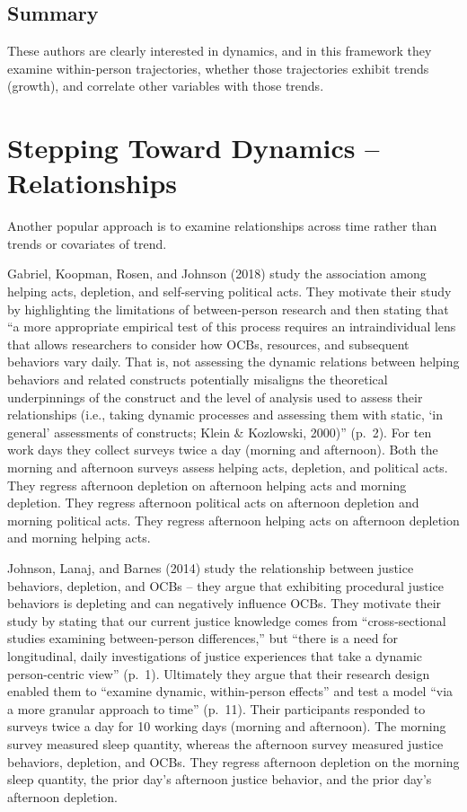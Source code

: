 \documentclass[english,,man]{apa6}
\theoremstyle{definition}
\theoremstyle{definition}
\theoremstyle{definition}
\theoremstyle{remark}
\begin{document}
\hypertarget{summary}{%
\subsection{Summary}\label{summary}}

These authors are clearly interested in dynamics, and in this framework
they examine within-person trajectories, whether those trajectories
exhibit trends (growth), and correlate other variables with those
trends.

\hypertarget{stepping-toward-dynamics-relationships}{%
\section{Stepping Toward Dynamics --
Relationships}\label{stepping-toward-dynamics-relationships}}

Another popular approach is to examine relationships across time rather
than trends or covariates of trend.

Gabriel, Koopman, Rosen, and Johnson (2018) study the association among
helping acts, depletion, and self-serving political acts. They motivate
their study by highlighting the limitations of between-person research
and then stating that \enquote{a more appropriate empirical test of this
process requires an intraindividual lens that allows researchers to
consider how OCBs, resources, and subsequent behaviors vary daily. That
is, not assessing the dynamic relations between helping behaviors and
related constructs potentially misaligns the theoretical underpinnings
of the construct and the level of analysis used to assess their
relationships (i.e., taking dynamic processes and assessing them with
static, \enquote{in general} assessments of constructs; Klein \&
Kozlowski, 2000)} (p.~2). For ten work days they collect surveys twice a
day (morning and afternoon). Both the morning and afternoon surveys
assess helping acts, depletion, and political acts. They regress
afternoon depletion on afternoon helping acts and morning depletion.
They regress afternoon political acts on afternoon depletion and morning
political acts. They regress afternoon helping acts on afternoon
depletion and morning helping acts.

Johnson, Lanaj, and Barnes (2014) study the relationship between justice
behaviors, depletion, and OCBs -- they argue that exhibiting procedural
justice behaviors is depleting and can negatively influence OCBs. They
motivate their study by stating that our current justice knowledge comes
from \enquote{cross-sectional studies examining between-person
differences,} but \enquote{there is a need for longitudinal, daily
investigations of justice experiences that take a dynamic person-centric
view} (p.~1). Ultimately they argue that their research design enabled
them to \enquote{examine dynamic, within-person effects} and test a
model \enquote{via a more granular approach to time} (p.~11). Their
participants responded to surveys twice a day for 10 working days
(morning and afternoon). The morning survey measured sleep quantity,
whereas the afternoon survey measured justice behaviors, depletion, and
OCBs. They regress afternoon depletion on the morning sleep quantity,
the prior day's afternoon justice behavior, and the prior day's
afternoon depletion.
\end{document}
